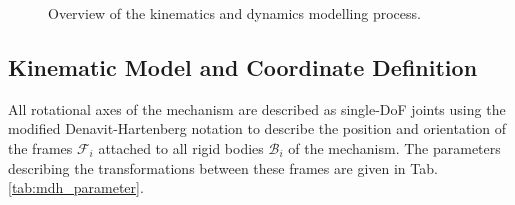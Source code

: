 \documentclass[twocolumn,10pt]{IFTOMM}
\newcommand{\body}[1]{{\mathcal{B}}_{#1}}
\newcommand{\ks}[1]{{\mathcal{F}}_{#1}}
\begin{document}
\begin{figure}[tb!]
    
    \caption{Overview of the kinematics and dynamics modelling process.}
    \label{fig:flowchart_overview}
\end{figure} 


\subsection{Kinematic Model and Coordinate Definition}
\label{sec:model_fullcoord}

All rotational axes of the mechanism are described as single-DoF joints using the modified Denavit-Hartenberg notation \cite{KhalilBen1995} to describe the position and orientation of the frames $\ks{i}$ attached to all rigid bodies $\body{i}$ of the mechanism.
The parameters describing the transformations between these frames are given in Tab.\,\ref{tab:mdh_parameter}.
%
\end{document}

